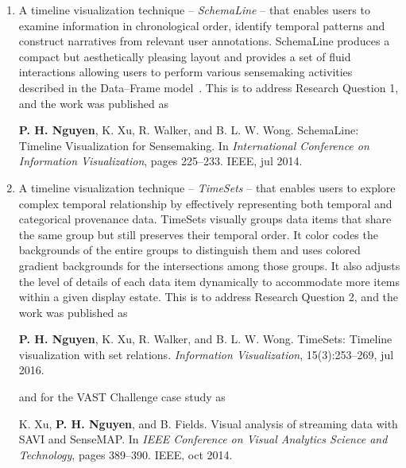 \begin{enumerate}
	\item A timeline visualization technique -- \emph{SchemaLine} -- that enables users to examine information in chronological order, identify temporal patterns and construct narratives from relevant user annotations. SchemaLine produces a compact but aesthetically pleasing layout and provides a set of fluid interactions allowing users to perform various sensemaking activities described in the Data--Frame model~\cite{Klein2003}. This is to address Research Question 1, and the work was published as 
	
	\qquad\textbf{P. H. Nguyen}, K. Xu, R. Walker, and B. L. W. Wong. SchemaLine: Timeline Visualization for Sensemaking. In \textit{International Conference on Information Visualization}, pages 225--233. IEEE, jul 2014.
	
	\item A timeline visualization technique -- \emph{TimeSets} -- that enables users to explore complex temporal relationship by effectively representing both temporal and categorical provenance data. TimeSets visually groups data items that share the same group but still preserves their temporal order. It color codes the backgrounds of the entire groups to distinguish them and uses colored gradient backgrounds for the intersections among those groups. It also adjusts the level of details of each data item dynamically to accommodate more items within a given display estate. This is to address Research Question 2, and the work was published as  
	
	\qquad\textbf{P. H. Nguyen}, K. Xu, R. Walker, and B. L. W. Wong. TimeSets: Timeline visualization with set relations. \textit{Information Visualization}, 15(3):253--269, jul 2016. 
	
	and for the VAST Challenge case study as
	
	\qquad K. Xu, \textbf{P. H. Nguyen}, and B. Fields. Visual analysis of streaming data with SAVI and SenseMAP. In \textit{IEEE Conference on Visual Analytics Science and Technology}, pages 389--390. IEEE, oct 2014.
	 

\end{enumerate}
